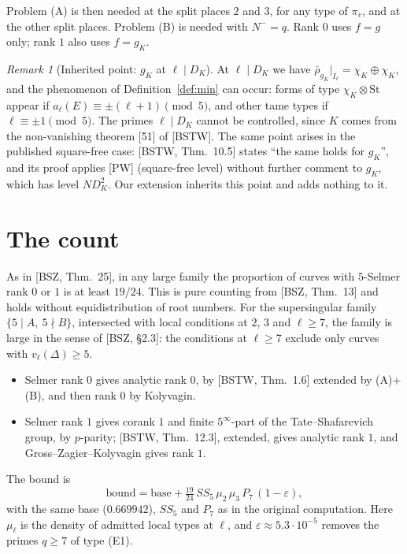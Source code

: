 \documentclass[11pt]{amsart}
\theoremstyle{definition}
\theoremstyle{remark}
\newtheorem{remark}[theorem]{Remark}
\newcommand{\St}{\mathrm{St}}
\begin{document}
Problem (A) is then needed at the split places $2$ and $3$, for any type of $\pi_v$, and at the other split places. Problem (B) is needed with $N^-=q$. Rank $0$ uses $f=g$ only; rank $1$ also uses $f=g_K$.

\begin{remark}[Inherited point: $g_K$ at $\ell\mid D_K$]\label{rem:gK}
At $\ell\mid D_K$ we have $\bar\rho_{g_K}|_{I_\ell}=\chi_K\oplus\chi_K$, and the phenomenon of Definition~\ref{def:min} can occur: forms of type $\chi_K\otimes\St$ appear if $a_\ell(E)\equiv\pm(\ell+1)\pmod 5$, and other tame types if $\ell\equiv\pm1\pmod 5$. The primes $\ell\mid D_K$ cannot be controlled, since $K$ comes from the non-vanishing theorem [51] of [BSTW]. The same point arises in the published square-free case: [BSTW, Thm.~10.5] states ``the same holds for $g_K$'', and its proof applies [PW] (square-free level) without further comment to $g_K$, which has level $ND_K^2$. Our extension inherits this point and adds nothing to it.
\end{remark}

\section{The count}\label{sec:count}
As in [BSZ, Thm.~25], in any large family the proportion of curves with $5$-Selmer rank $0$ or $1$ is at least $19/24$. This is pure counting from [BSZ, Thm.~13] and holds without equidistribution of root numbers. For the supersingular family $\{5\mid A,\ 5\nmid B\}$, intersected with local conditions at $2$, $3$ and $\ell\ge7$, the family is large in the sense of [BSZ, \S 2.3]: the conditions at $\ell\ge7$ exclude only curves with $v_\ell(\Delta)\ge5$.
\begin{itemize}
\item Selmer rank $0$ gives analytic rank $0$, by [BSTW, Thm.~1.6] extended by (A)+(B), and then rank $0$ by Kolyvagin.
\item Selmer rank $1$ gives corank $1$ and finite $5^\infty$-part of the Tate--Shafarevich group, by $p$-parity; [BSTW, Thm.~12.3], extended, gives analytic rank $1$, and Gross--Zagier--Kolyvagin gives rank $1$.
\end{itemize}
The bound is
\[ \text{bound}=\text{base}+\tfrac{19}{24}\,SS_5\,\mu_2\,\mu_3\,P_7\,(1-\varepsilon), \]
with the same base ($0.669942$), $SS_5$ and $P_7$ as in the original computation. Here $\mu_\ell$ is the density of admitted local types at $\ell$, and $\varepsilon\approx5.3\cdot10^{-5}$ removes the primes $q\ge7$ of type (E1).
\end{document}
